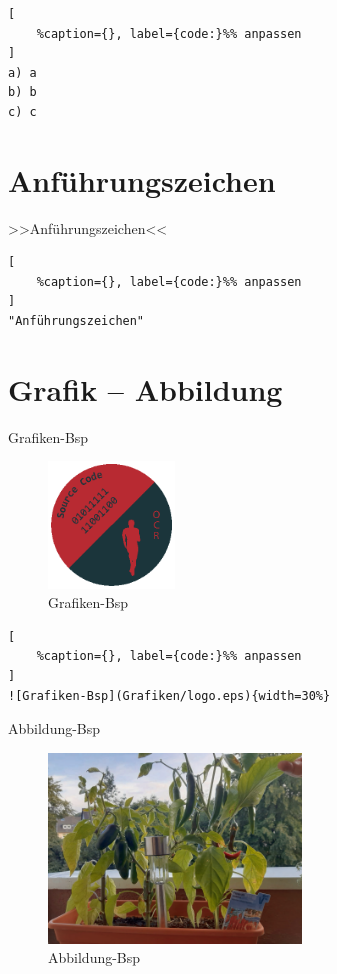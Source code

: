 \lstset{language=C}%
\begin{lstlisting}[
	%caption={}, label={code:}%% anpassen
]
a) a
b) b
c) c
\end{lstlisting}

\section{Anführungszeichen}\label{anfuehrungszeichen}

>>Anführungszeichen<<

\lstset{language=C}%
\begin{lstlisting}[
	%caption={}, label={code:}%% anpassen
]
"Anführungszeichen" 
\end{lstlisting}

\section{Grafik -- Abbildung}\label{grafik-abbildung}

Grafiken-Bsp %

\begin{figure}[!hb]%
\centering
\includegraphics[width=0.3\textwidth]{Grafiken/logo.eps}
\caption{Grafiken-Bsp}
\end{figure}

\lstset{language=C}%
\begin{lstlisting}[
	%caption={}, label={code:}%% anpassen
]
![Grafiken-Bsp](Grafiken/logo.eps){width=30%}
\end{lstlisting}

Abbildung-Bsp %

\begin{figure}[!hb]%
\centering
\includegraphics[width=0.6\textwidth]{images/Chili-1.pdf}
\caption{Abbildung-Bsp}
\end{figure}

